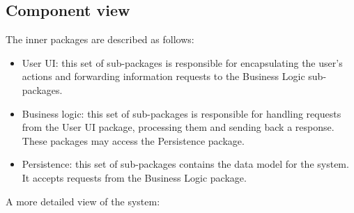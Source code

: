 \documentclass[a4paper,11pt]{report} %
\begin{document}
	
	\subsection{Component view}
	The inner packages are described as follows:\\
	\begin{itemize}
		\item User UI:	this set of sub-packages is responsible for encapsulating the user's actions and forwarding information requests to the Business Logic sub-packages.
		\item Business logic: this set of sub-packages is responsible for handling requests from the User UI package, processing them and sending back a response. These packages may access the Persistence package.
		\item Persistence: this set of sub-packages contains the data model for the system. It accepts requests from the Business Logic package.
	\end{itemize}
	A more detailed view of the system:\\
\end{document}
